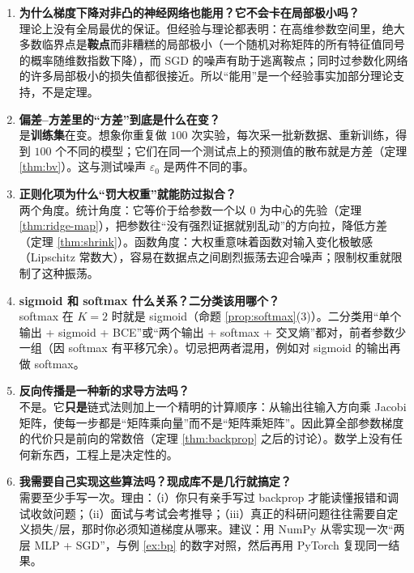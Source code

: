 \documentclass[UTF8,a4paper,11pt]{ctexart}
\theoremstyle{definition}
\theoremstyle{plain}
\theoremstyle{remark}
\begin{document}
\begin{enumerate}[label=\textbf{Q\arabic*.},leftmargin=2.6em]
\item \textbf{为什么梯度下降对非凸的神经网络也能用？它不会卡在局部极小吗？}\\
理论上没有全局最优的保证。但经验与理论都表明：在高维参数空间里，绝大多数临界点是\textbf{鞍点}而非糟糕的局部极小（一个随机对称矩阵的所有特征值同号的概率随维数指数下降），而 SGD 的噪声有助于逃离鞍点；同时过参数化网络的许多局部极小的损失值都很接近。所以“能用”是一个经验事实加部分理论支持，不是定理。

\item \textbf{偏差--方差里的“方差”到底是什么在变？}\\
是\textbf{训练集}在变。想象你重复做 $100$ 次实验，每次采一批新数据、重新训练，得到 $100$ 个不同的模型；它们在同一个测试点上的预测值的散布就是方差（定理 \ref{thm:bv}）。这与测试噪声 $\varepsilon_0$ 是两件不同的事。

\item \textbf{正则化项为什么“罚大权重”就能防过拟合？}\\
两个角度。统计角度：它等价于给参数一个以 $0$ 为中心的先验（定理 \ref{thm:ridge-map}），把参数往“没有强烈证据就别乱动”的方向拉，降低方差（定理 \ref{thm:shrink}）。函数角度：大权重意味着函数对输入变化极敏感（Lipschitz 常数大），容易在数据点之间剧烈振荡去迎合噪声；限制权重就限制了这种振荡。

\item \textbf{sigmoid 和 softmax 什么关系？二分类该用哪个？}\\
softmax 在 $K=2$ 时就是 sigmoid（命题 \ref{prop:softmax}(3)）。二分类用“单个输出 + sigmoid + BCE”或“两个输出 + softmax + 交叉熵”都对，前者参数少一组（因 softmax 有平移冗余）。切忌把两者混用，例如对 sigmoid 的输出再做 softmax。

\item \textbf{反向传播是一种新的求导方法吗？}\\
不是。它\textbf{只是}链式法则加上一个精明的计算顺序：从输出往输入方向乘 Jacobi 矩阵，使每一步都是“矩阵乘向量”而不是“矩阵乘矩阵”。因此算全部参数梯度的代价只是前向的常数倍（定理 \ref{thm:backprop} 之后的讨论）。数学上没有任何新东西，工程上是决定性的。

\item \textbf{我需要自己实现这些算法吗？现成库不是几行就搞定？}\\
需要至少手写一次。理由：（i）你只有亲手写过 backprop 才能读懂报错和调试收敛问题；（ii）面试与考试会考推导；（iii）真正的科研问题往往需要自定义损失/层，那时你必须知道梯度从哪来。建议：用 NumPy 从零实现一次“两层 MLP + SGD”，与例 \ref{ex:bp} 的数字对照，然后再用 PyTorch 复现同一结果。


\end{enumerate}
\end{document}
